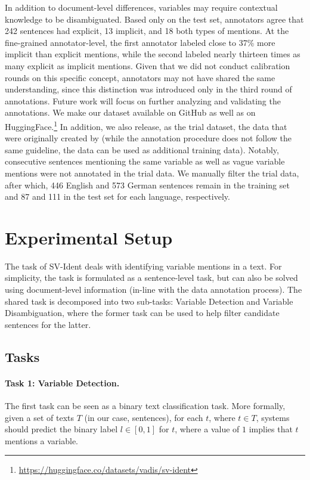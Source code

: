 \documentclass[11pt]{article}
\begin{document}
In addition to document-level differences, variables may require contextual knowledge to be disambiguated.
Based only on the test set, annotators agree that 242 sentences had explicit, 13 implicit, and 18 both types of mentions.
At the fine-grained annotator-level, the first annotator labeled close to 37\% more implicit than explicit mentions, while the second labeled nearly thirteen times as many explicit as implicit mentions.
Given that we did not conduct calibration rounds on this specific concept, annotators may not have shared the same understanding, since this distinction was introduced only in the third round of annotations.
Future work will focus on further analyzing and validating the annotations.
We make our dataset available on GitHub as well as on HuggingFace.\footnote{\url{https://huggingface.co/datasets/vadis/sv-ident}}
In addition, we also release, as the trial dataset, the data that were originally created by \citet{zielinski-mutschke-2018-towards} (while the annotation procedure does not follow the same guideline, the data can be used as additional training data).
Notably, consecutive sentences mentioning the same variable as well as vague variable mentions were not annotated in the trial data.
We manually filter the trial data, after which, 446 English and 573 German sentences remain in the training set and 87 and 111 in the test set for each language, respectively.


\section{Experimental Setup}
\label{sec:experimental-setup}
The task of SV-Ident deals with identifying variable mentions in a text.
For simplicity, the task is formulated as a sentence-level task, but can also be solved using document-level information (in-line with the data annotation process).
The shared task is decomposed into two sub-tasks: Variable Detection and Variable Disambiguation, where the former task can be used to help filter candidate sentences for the latter.

\subsection{Tasks}
\paragraph{Task 1: Variable Detection.} The first task can be seen as a binary text classification task.
More formally, given a set of texts $T$ (in our case, sentences), for each $t$, where $t \in T$, systems should predict the binary label $l \in [0,1]$ for $t$, where a value of $1$ implies that $t$ mentions a variable.
\end{document}
